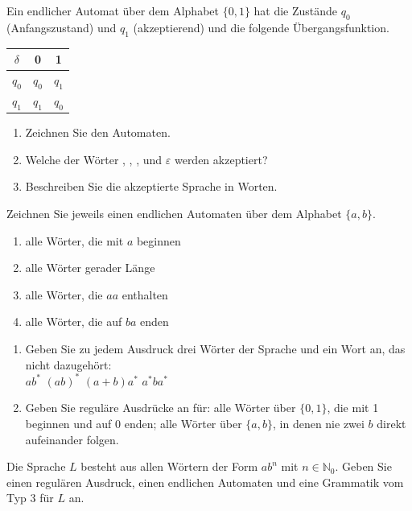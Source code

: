 \ueben
{}
Ein endlicher Automat über dem Alphabet $\{0, 1\}$ hat die Zustände $q_0$ (Anfangszustand) und $q_1$ (akzeptierend) und die folgende Übergangsfunktion.
\begin{center}
\begin{tabular}{c|cc}
$\delta$ & 0 & 1 \\ \hline
$q_0$ & $q_0$ & $q_1$ \\
$q_1$ & $q_1$ & $q_0$
\end{tabular}
\end{center}
\begin{enumerate}[label=\alph*)]
\item Zeichnen Sie den Automaten.
\item Welche der Wörter , , ,  und $\varepsilon$ werden akzeptiert?
\item Beschreiben Sie die akzeptierte Sprache in Worten.
\end{enumerate}

Zeichnen Sie jeweils einen endlichen Automaten über dem Alphabet $\{a, b\}$.
\begin{enumerate}[label=\alph*)]
\item alle Wörter, die mit $a$ beginnen
\item alle Wörter gerader Länge
\item alle Wörter, die $aa$ enthalten
\item alle Wörter, die auf $ba$ enden
\end{enumerate}

\begin{enumerate}[label=\alph*)]
\item Geben Sie zu jedem Ausdruck drei Wörter der Sprache und ein Wort an, das nicht dazugehört: \\[1mm]
$ab^*$ \qquad $(ab)^*$ \qquad $(a + b)a^*$ \qquad $a^*ba^*$
\item Geben Sie reguläre Ausdrücke an für: alle Wörter über $\{0, 1\}$, die mit 1 beginnen und auf 0 enden; alle Wörter über $\{a, b\}$, in denen nie zwei $b$ direkt aufeinander folgen.
\end{enumerate}

Die Sprache $L$ besteht aus allen Wörtern der Form $a b^n$ mit $n \in \mathbb{N}_0$. Geben Sie einen regulären Ausdruck, einen endlichen Automaten und eine Grammatik vom Typ 3 für $L$ an.

